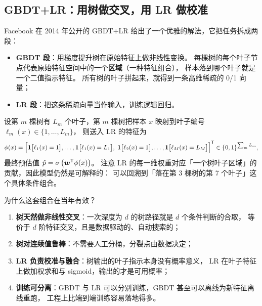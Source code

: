 \subsection{GBDT+LR：用树做交叉，用 LR 做校准}

Facebook 在 2014 年公开的 GBDT+LR \cite{he2014practical} 给出了一个优雅的解法，它把任务拆成两段：

\begin{itemize}
  \item \textbf{GBDT 段}：用梯度提升树在原始特征上做非线性变换。
        每棵树的每个叶子节点代表原始特征空间中的一个\textbf{区域}（一种特征组合），
        样本落到哪个叶子就是一个二值指示特征。
        所有树的叶子拼起来，就得到一条高维稀疏的 0/1 向量；
  \item \textbf{LR 段}：把这条稀疏向量当作输入，训练逻辑回归。
\end{itemize}

\begin{formulacard}
设第 $m$ 棵树有 $L_m$ 个叶子，第 $m$ 棵树把样本 $x$ 映射到叶子编号 $\ell_m(x) \in \{1,\dots,L_m\}$，
则送入 LR 的特征为
\begin{equation}
\phi(x) = \Big[ \mathbf{1}\big[\ell_1(x)=1\big], \dots, \mathbf{1}\big[\ell_1(x)=L_1\big], \;
\mathbf{1}\big[\ell_2(x)=1\big], \dots, \mathbf{1}\big[\ell_M(x)=L_M\big] \Big]^{\mathsf{T}} \in \{0,1\}^{\sum_m L_m},
\label{eq:gbdt-lr}
\end{equation}
最终预估值 $\hat{p} = \operatorname{\sigma}\big(\bm{w}^{\mathsf{T}} \phi(x)\big)$。
注意 LR 的每一维权重对应「一个树叶子区域」的贡献，因此模型仍然是可解释的：
可以回溯到「落在第 3 棵树的第 7 个叶子」这个具体条件组合。
\end{formulacard}

为什么这套组合在当年有效？

\begin{enumerate}
  \item \textbf{树天然做非线性交叉}：一次深度为 $d$ 的树路径就是 $d$ 个条件判断的合取，
        等价于 $d$ 阶特征交叉，且是数据驱动的、自动搜索的；
  \item \textbf{树对连续值鲁棒}：不需要人工分桶，分裂点由数据决定；
  \item \textbf{LR 负责校准与融合}：树输出的叶子指示本身没有概率意义，
        LR 在叶子特征上做加权求和与 sigmoid，输出的才是可用概率；
  \item \textbf{训练可分离}：GBDT 与 LR 可以分别训练，GBDT 甚至可以离线为新特征离线重跑，
        工程上比端到端训练容易落地得多。
\end{enumerate}

